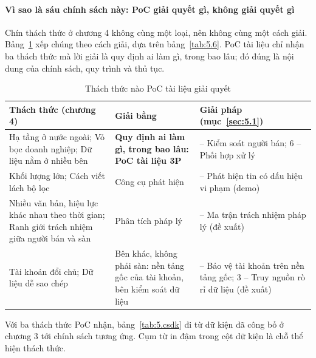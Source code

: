 \paragraph{Vì sao là sáu chính sách này: PoC giải quyết gì, không giải quyết gì}

Chín thách thức ở chương 4 không cùng một loại, nên không cùng một cách giải. Bảng~\ref{tab:5.pv} xếp chúng theo cách giải, dựa trên bảng~\ref{tab:5.6}. PoC tài liệu chỉ nhận ba thách thức mà lời giải là quy định ai làm gì, trong bao lâu; đó đúng là nội dung của chính sách, quy trình và thủ tục.

{\small{}
\begin{table}[H]
\centering
\caption{Thách thức nào PoC tài liệu giải quyết}\label{tab:5.pv}
\begin{tabularx}{\textwidth}{>{\hsize=1.1\hsize\raggedright\arraybackslash}X>{\hsize=1.0\hsize\raggedright\arraybackslash}X>{\hsize=0.9\hsize\raggedright\arraybackslash}X}
\toprule
\textbf{Thách thức (chương 4)} & \textbf{Giải bằng} & \textbf{Giải pháp (mục~\ref{sec:5.1})} \\
\midrule
Hạ tầng ở nước ngoài; Vỏ bọc doanh nghiệp; Dữ liệu nằm ở nhiều bên & \textbf{Quy định ai làm gì, trong bao lâu: PoC tài liệu 3P} & 4 -- Kiểm soát người bán; 6 -- Phối hợp xử lý \\
Khối lượng lớn; Cách viết lách bộ lọc & Công cụ phát hiện & 1 -- Phát hiện tin có dấu hiệu vi phạm (demo) \\
Nhiều văn bản, hiệu lực khác nhau theo thời gian; Ranh giới trách nhiệm giữa người bán và sàn & Phân tích pháp lý & 5 -- Ma trận trách nhiệm pháp lý (đề xuất) \\
Tài khoản đổi chủ; Dữ liệu dễ sao chép & Bên khác, không phải sàn: nền tảng gốc của tài khoản, bên kiểm soát dữ liệu & 2 -- Bảo vệ tài khoản trên nền tảng gốc; 3 -- Truy nguồn rò rỉ dữ liệu (đề xuất) \\
\bottomrule
\end{tabularx}
\end{table}}

Với ba thách thức PoC nhận, bảng~\ref{tab:5.csdk} đi từ dữ kiện đã công bố ở chương 3 tới chính sách tương ứng. Cụm từ in đậm trong cột dữ kiện là chỗ thể hiện thách thức.

